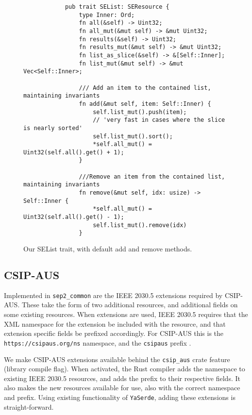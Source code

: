 \begin{figure}[H]
    \begin{center}
        \begin{lstlisting}
            pub trait SEList: SEResource {
                type Inner: Ord;
                fn all(&self) -> Uint32;
                fn all_mut(&mut self) -> &mut Uint32;
                fn results(&self) -> Uint32;
                fn results_mut(&mut self) -> &mut Uint32;
                fn list_as_slice(&self) -> &[Self::Inner];
                fn list_mut(&mut self) -> &mut Vec<Self::Inner>;
            
                /// Add an item to the contained list, maintaining invariants
                fn add(&mut self, item: Self::Inner) {
                    self.list_mut().push(item);
                    // 'very fast in cases where the slice is nearly sorted'
                    self.list_mut().sort();
                    *self.all_mut() = Uint32(self.all().get() + 1);
                }
                
                ///Remove an item from the contained list, maintaining invariants
                fn remove(&mut self, idx: usize) -> Self::Inner {
                    *self.all_mut() = Uint32(self.all().get() - 1);
                    self.list_mut().remove(idx)
                }
        \end{lstlisting}
        \label{fig:listtraitimpl}
        \caption{Our SEList trait, with default add and remove methods.}
    \end{center}
\end{figure}

\subsection{CSIP-AUS}
Implemented in \texttt{sep2\_common} are the IEEE 2030.5 extensions required by CSIP-AUS. These take the form of two additional resources, and additional fields on some existing resources. When extensions are used, IEEE 2030.5 requires that the XML namespace for the extension be included with the resource, and that extension specific fields be prefixed accordingly. For CSIP-AUS this is the \texttt{https://csipaus.org/ns} namespace, and the \texttt{csipaus} prefix  \cite{CSIPAus}.

We make CSIP-AUS extensions available behind the \texttt{csip\_aus} crate feature (library compile flag). When activated, the Rust compiler adds the namespace to existing IEEE 2030.5 resources, and adds the prefix to their respective fields. It also makes the new resources available for use, also with the correct namespace and prefix. Using existing functionality of \texttt{YaSerde}, adding these extensions is straight-forward.

